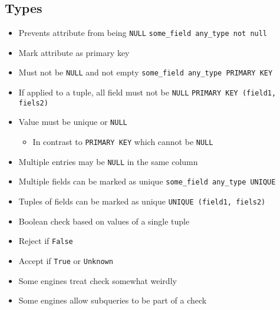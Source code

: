 \subsection{Types}
\begin{itemize}
        \begin{itemize}
            \item Prevents attribute from being \verb+NULL+
             \verb+some_field any_type not null+
        \end{itemize}
        \begin{itemize}
            \item Mark attribute as primary key
            \item Must not be \verb+NULL+ and not empty
             \verb+some_field any_type PRIMARY KEY+
            \item If applied to a tuple, all field must not be \verb+NULL+
             \verb+PRIMARY KEY (field1, fiels2)+
        \end{itemize}
        \begin{itemize}
            \item Value must be unique or \verb+NULL+
                \begin{itemize}
                    \item In contrast to \verb+PRIMARY KEY+ which cannot be \verb+NULL+
                \end{itemize}
            \item Multiple entries may be \verb+NULL+ in the same column
            \item Multiple fields can be marked as unique
             \verb+some_field any_type UNIQUE+
            \item Tuples of fields can be marked as unique
             \verb+UNIQUE (field1, fiels2)+
        \end{itemize}
        \begin{itemize}
            \item Boolean check based on values of a single tuple
            \item Reject if \verb+False+
            \item Accept if \verb+True+ or \verb+Unknown+
            \item Some engines treat check somewhat weirdly
            \item Some engines allow subqueries to be part of a check

\end{itemize}
\end{itemize}
